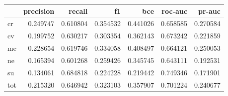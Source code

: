 \begin{tabular}{lrrrrrr}
\toprule
{} &  precision &    recall &        f1 &       bce &   roc-auc &    pr-auc \\
\midrule
cr  &   0.249747 &  0.610804 &  0.354532 &  0.441026 &  0.658585 &  0.270584 \\
cv  &   0.199752 &  0.630217 &  0.303354 &  0.362143 &  0.673242 &  0.221859 \\
me  &   0.228654 &  0.619746 &  0.334058 &  0.408497 &  0.664121 &  0.250053 \\
ne  &   0.165394 &  0.601268 &  0.259426 &  0.345745 &  0.643111 &  0.192531 \\
su  &   0.134061 &  0.684818 &  0.224228 &  0.219442 &  0.749346 &  0.171901 \\
tot &   0.215320 &  0.646942 &  0.323103 &  0.357907 &  0.701224 &  0.240677 \\
\bottomrule
\end{tabular}
